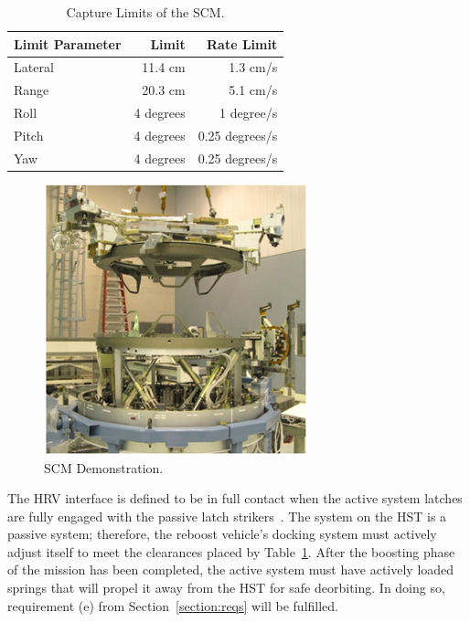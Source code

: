 \documentclass[paper=letter, fontsize=11pt]{scrartcl} %
\numberwithin{equation}{section} %
\numberwithin{figure}{section} %
\numberwithin{table}{section} %
\begin{document}
\begin{table}[H]
\begin{center}
\begin{tabular}{l r r}
\toprule
Limit Parameter & Limit & Rate Limit \\
\midrule
Lateral & 11.4 cm & 1.3 cm/s \\
Range & 20.3 cm & 5.1 cm/s \\
Roll & 4 degrees & 1 degree/s \\
Pitch & 4 degrees & 0.25 degrees/s \\
Yaw & 4 degrees & 0.25 degrees/s \\
\bottomrule
\end{tabular}
\end{center}
\caption{Capture Limits of the SCM.}
\label{table:capture_limits}
\end{table}

\begin{figure}[H]
\begin{center}
\includegraphics[height=0.4\textheight]{HST_Interface_Figures/H2.png}
\caption{SCM Demonstration.}
\label{H2}
\end{center}
\end{figure}

The HRV interface is defined to be in full contact when the active system latches are fully engaged with the passive latch strikers~\cite{ref5}. The system on the HST is a passive system; therefore, the reboost vehicle's docking system must actively adjust itself to meet the clearances placed by Table~\ref{table:capture_limits}. After the boosting phase of the mission has been completed, the active system must have actively loaded springs that will propel it away from the HST for safe deorbiting. In doing so, requirement (e) from Section~\ref{section:reqs} will be fulfilled.
\end{document}
